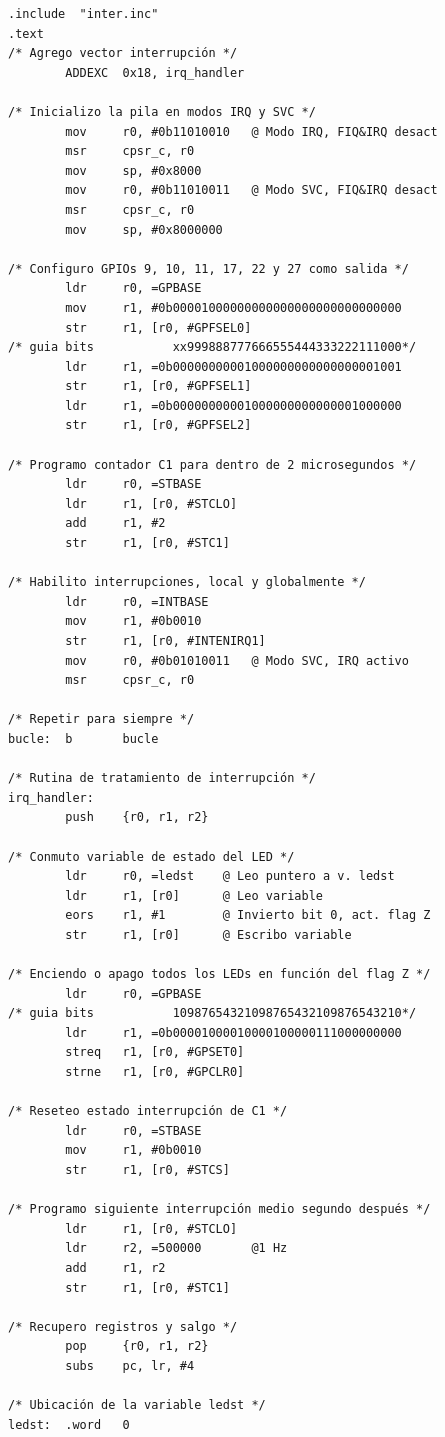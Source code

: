 \begin{lstlisting}[caption={inter2.s},label={lst:codigoPract5_2}]
        .include  "inter.inc"
.text
/* Agrego vector interrupción */
        ADDEXC  0x18, irq_handler

/* Inicializo la pila en modos IRQ y SVC */
        mov     r0, #0b11010010   @ Modo IRQ, FIQ&IRQ desact
        msr     cpsr_c, r0
        mov     sp, #0x8000
        mov     r0, #0b11010011   @ Modo SVC, FIQ&IRQ desact
        msr     cpsr_c, r0
        mov     sp, #0x8000000

/* Configuro GPIOs 9, 10, 11, 17, 22 y 27 como salida */
        ldr     r0, =GPBASE
        mov     r1, #0b00001000000000000000000000000000
        str     r1, [r0, #GPFSEL0]
/* guia bits           xx999888777666555444333222111000*/
        ldr     r1, =0b00000000001000000000000000001001
        str     r1, [r0, #GPFSEL1]
        ldr     r1, =0b00000000001000000000000001000000
        str     r1, [r0, #GPFSEL2]

/* Programo contador C1 para dentro de 2 microsegundos */
        ldr     r0, =STBASE
        ldr     r1, [r0, #STCLO]
        add     r1, #2
        str     r1, [r0, #STC1]

/* Habilito interrupciones, local y globalmente */
        ldr     r0, =INTBASE
        mov     r1, #0b0010
        str     r1, [r0, #INTENIRQ1]
        mov     r0, #0b01010011   @ Modo SVC, IRQ activo
        msr     cpsr_c, r0

/* Repetir para siempre */
bucle:  b       bucle

/* Rutina de tratamiento de interrupción */
irq_handler:
        push    {r0, r1, r2}

/* Conmuto variable de estado del LED */
        ldr     r0, =ledst    @ Leo puntero a v. ledst
        ldr     r1, [r0]      @ Leo variable
        eors    r1, #1        @ Invierto bit 0, act. flag Z
        str     r1, [r0]      @ Escribo variable

/* Enciendo o apago todos los LEDs en función del flag Z */
        ldr     r0, =GPBASE
/* guia bits           10987654321098765432109876543210*/
        ldr     r1, =0b00001000010000100000111000000000
        streq   r1, [r0, #GPSET0]
        strne   r1, [r0, #GPCLR0]

/* Reseteo estado interrupción de C1 */
        ldr     r0, =STBASE
        mov     r1, #0b0010
        str     r1, [r0, #STCS]

/* Programo siguiente interrupción medio segundo después */
        ldr     r1, [r0, #STCLO]
        ldr     r2, =500000       @1 Hz
        add     r1, r2
        str     r1, [r0, #STC1]

/* Recupero registros y salgo */
        pop     {r0, r1, r2}
        subs    pc, lr, #4

/* Ubicación de la variable ledst */
ledst:  .word   0
\end{lstlisting}

